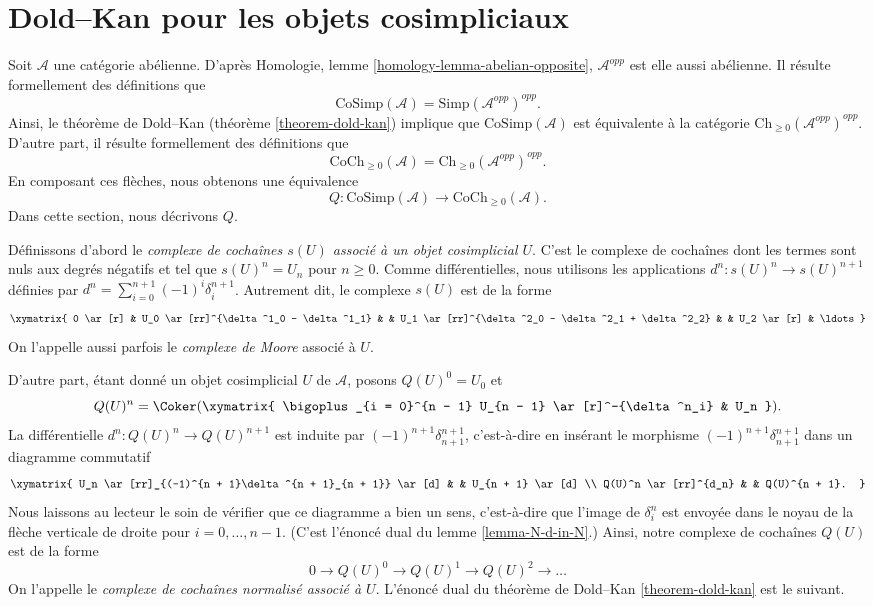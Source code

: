 \section{Dold--Kan pour les objets cosimpliciaux}
\label{section-dold-kan-cosimplicial}

\noindent
Soit $\mathcal{A}$ une catégorie abélienne.
D'après Homologie, lemme \ref{homology-lemma-abelian-opposite},
$\mathcal{A}^{opp}$ est elle aussi abélienne. Il résulte
formellement des définitions que
$$
\text{CoSimp}(\mathcal{A}) = \text{Simp}(\mathcal{A}^{opp})^{opp}.
$$
Ainsi, le théorème de Dold--Kan
(théorème \ref{theorem-dold-kan})
implique que $\text{CoSimp}(\mathcal{A})$ est équivalente à
la catégorie
$\text{Ch}_{\geq 0}(\mathcal{A}^{opp})^{opp}$. D'autre part, il
résulte formellement des définitions que
$$
\text{CoCh}_{\geq 0}(\mathcal{A}) =
\text{Ch}_{\geq 0}(\mathcal{A}^{opp})^{opp}.
$$
En composant ces flèches, nous obtenons une équivalence
$$
Q :
\text{CoSimp}(\mathcal{A})
\longrightarrow
\text{CoCh}_{\geq 0}(\mathcal{A}).
$$
Dans cette section, nous décrivons $Q$.

\medskip\noindent
Définissons d'abord le
{\it complexe de cochaînes $s(U)$ associé à un objet
cosimplicial $U$}. C'est le complexe de cochaînes dont les termes sont
nuls aux degrés négatifs et tel que $s(U)^n = U_n$ pour $n \geq 0$.
Comme différentielles, nous utilisons les applications
$d^n : s(U)^n \to s(U)^{n + 1}$ définies par
$d^n = \sum_{i = 0}^{n + 1} (-1)^i \delta^{n + 1}_i$.
Autrement dit, le complexe $s(U)$ est de la forme
$$
\xymatrix{
0 \ar[r] &
U_0 \ar[rr]^{\delta^1_0 - \delta^1_1} & &
U_1 \ar[rr]^{\delta^2_0 - \delta^2_1 + \delta^2_2} & &
U_2 \ar[r] &
\ldots
}
$$
On l'appelle aussi parfois le {\it complexe de Moore} associé
à $U$.

\medskip\noindent
D'autre part, étant donné un objet
cosimplicial $U$ de $\mathcal{A}$, posons
$Q(U)^0 = U_0$ et
$$
Q(U)^n = \Coker(
\xymatrix{
\bigoplus_{i = 0}^{n - 1} U_{n - 1} \ar[r]^-{\delta^n_i} &
U_n
}).
$$
La différentielle $d^n : Q(U)^n \to Q(U)^{n + 1}$
est induite par $(-1)^{n + 1}\delta^{n + 1}_{n + 1}$, c'est-à-dire
en insérant le morphisme
$(-1)^{n + 1}\delta^{n + 1}_{n + 1}$
dans un diagramme
commutatif
$$
\xymatrix{
U_n \ar[rr]_{(-1)^{n + 1}\delta^{n + 1}_{n + 1}} \ar[d] & &
U_{n + 1} \ar[d] \\
Q(U)^n \ar[rr]^{d_n} & &
Q(U)^{n + 1}.
}
$$
Nous laissons au lecteur le soin de vérifier que ce diagramme a bien
un sens, c'est-à-dire que l'image de $\delta^n_i$ est envoyée dans
le noyau de la flèche verticale de droite pour $i = 0, \ldots, n - 1$.
(C'est l'énoncé dual du lemme \ref{lemma-N-d-in-N}.)
Ainsi, notre complexe de cochaînes $Q(U)$ est de la forme
$$
0 \to Q(U)^0 \to Q(U)^1 \to Q(U)^2 \to \ldots
$$
On l'appelle le {\it complexe de cochaînes normalisé associé
à $U$}.
L'énoncé dual du théorème de Dold--Kan \ref{theorem-dold-kan} est le suivant.

